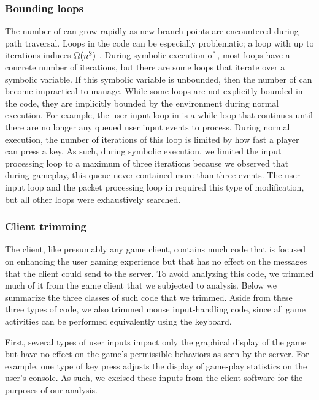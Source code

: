 \subsubsection{Bounding loops} 
The number of \pathsegcons can grow rapidly as new branch points are
encountered during path traversal. Loops in the code can be especially
problematic; a loop with up to \loopIterations iterations induces
$\Omega(n^2)$ \pathsegcons. During symbolic execution of
\xpilot, most loops have a concrete number of iterations, but there
are some loops that iterate over a symbolic variable. If this symbolic
variable is unbounded, then the number of \pathsegcons can become
impractical to manage. While some loops are not explicitly bounded in
the code, they are implicitly bounded by the environment during normal
execution. For example, the user input loop in \xpilot is a while loop
that continues until there are no longer any queued user input events
to process.  During normal execution, the number of iterations of this
loop is limited by how fast a player can press a key.  As such, during
symbolic execution, we limited the input processing loop to a maximum
of three iterations because we observed that during gameplay, this
queue never contained more than three events. The user input loop and
the packet processing loop in \xpilot required this type of
modification, but all other loops were exhaustively searched.

\subsubsection{Client trimming}
The \xpilot client, like presumably any game client, contains much
code that is focused on enhancing the user gaming experience but that
has no effect on the messages that the client could send to the
server.  To avoid analyzing this code, we trimmed much of it from the
game client that we subjected to analysis.  Below we summarize the
three classes of such code that we trimmed.  Aside from these three
types of code, we also trimmed mouse input-handling code, since all
game activities can be performed equivalently using the keyboard.

First, several types of user inputs impact only the graphical display
of the game but have no effect on the game's permissible behaviors as
seen by the server.  For example, one type of key press adjusts the
display of game-play statistics on the user's console.  As such, we
excised these inputs from the client software for the purposes of our
analysis.

